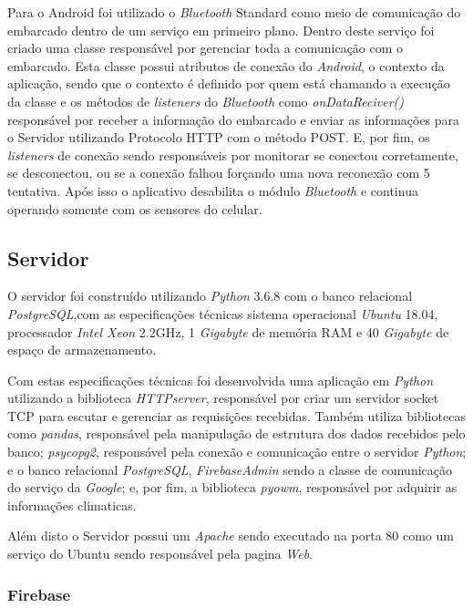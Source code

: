 Para o Android foi utilizado o \textit{Bluetooth} Standard como meio de comunicação do embarcado dentro de um serviço em primeiro plano. Dentro deste serviço foi criado uma classe responsável por gerenciar toda a comunicação com o embarcado. Esta classe possui atributos de conexão do \textit{Android}, o contexto da aplicação, sendo que o contexto é definido por quem está chamando a execução da classe e os métodos de \textit{listeners } do \textit{Bluetooth} como \textit{onDataReciver()} responsável por receber a informação do embarcado e enviar as informações para o Servidor utilizando Protocolo HTTP com o método POST. E, por fim,  os \textit{listeners } de conexão sendo responsáveis por monitorar se conectou corretamente, se desconectou, ou se a conexão falhou forçando uma nova  reconexão com 5 tentativa. Após isso o aplicativo desabilita o módulo \textit{Bluetooth} e continua operando somente com os sensores do celular.


\subsection{\textbf{Servidor}}

O servidor foi construído utilizando \textit{Python} 3.6.8 com o banco relacional   \textit{PostgreSQL},com as  especificações técnicas sistema operacional \textit{Ubuntu}  18.04, processador \textit{Intel Xeon} 2.2GHz, 1 \textit{Gigabyte}  de memória RAM e 40 \textit{Gigabyte} de espaço de armazenamento.

Com estas especificações técnicas foi desenvolvida uma aplicação em \textit{Python} utilizando a biblioteca \textit{HTTPserver}, responsável por criar um servidor socket TCP para escutar e gerenciar as requisições recebidas. Também utiliza bibliotecas como \textit{pandas}, responsável pela manipulação de estrutura dos dados recebidos pelo banco; \textit{psycopg2}, responsável pela conexão e comunicação entre o servidor \textit{Python}; e o banco relacional \textit{PostgreSQL}, \textit{FirebaseAdmin} sendo a classe de comunicação do serviço da \textit{Google}; e, por fim, a biblioteca \textit{pyowm}, responsável por adquirir as informações climaticas.

Além disto o Servidor possui um \textit{Apache} sendo executado na porta 80 como  um serviço do Ubuntu sendo responsável pela pagina \textit{Web}.


\subsubsection{Firebase}

